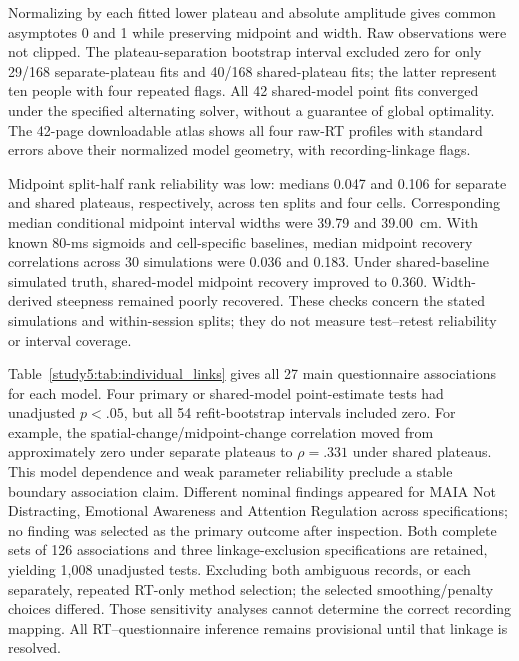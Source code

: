 Normalizing by each fitted lower plateau and absolute amplitude gives common asymptotes 0 and 1 while preserving midpoint and width. Raw observations were not clipped. The plateau-separation bootstrap interval excluded zero for only 29/168 separate-plateau fits and 40/168 shared-plateau fits; the latter represent ten people with four repeated flags. All 42 shared-model point fits converged under the specified alternating solver, without a guarantee of global optimality. The 42-page downloadable atlas shows all four raw-RT profiles with standard errors above their normalized model geometry, with recording-linkage flags.

Midpoint split-half rank reliability was low: medians 0.047 and 0.106 for separate and shared plateaus, respectively, across ten splits and four cells. Corresponding median conditional midpoint interval widths were 39.79 and 39.00~cm. With known 80-ms sigmoids and cell-specific baselines, median midpoint recovery correlations across 30 simulations were 0.036 and 0.183. Under shared-baseline simulated truth, shared-model midpoint recovery improved to 0.360. Width-derived steepness remained poorly recovered. These checks concern the stated simulations and within-session splits; they do not measure test--retest reliability or interval coverage.

Table~\ref{study5:tab:individual_links} gives all 27 main questionnaire associations for each model. Four primary or shared-model point-estimate tests had unadjusted $p<.05$, but all 54 refit-bootstrap intervals included zero. For example, the spatial-change/midpoint-change correlation moved from approximately zero under separate plateaus to $\rho=.331$ under shared plateaus. This model dependence and weak parameter reliability preclude a stable boundary association claim. Different nominal findings appeared for MAIA Not Distracting, Emotional Awareness and Attention Regulation across specifications; no finding was selected as the primary outcome after inspection. Both complete sets of 126 associations and three linkage-exclusion specifications are retained, yielding 1,008 unadjusted tests. Excluding both ambiguous records, or each separately, repeated RT-only method selection; the selected smoothing/penalty choices differed. Those sensitivity analyses cannot determine the correct recording mapping. All RT--questionnaire inference remains provisional until that linkage is resolved.

